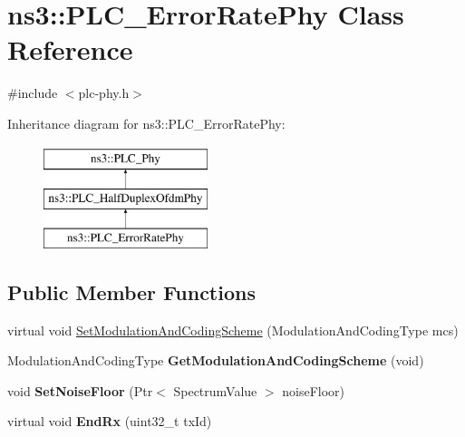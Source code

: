 \hypertarget{classns3_1_1PLC__ErrorRatePhy}{\section{ns3\-:\-:\-P\-L\-C\-\_\-\-Error\-Rate\-Phy \-Class \-Reference}
\label{classns3_1_1PLC__ErrorRatePhy}
}


{\ttfamily \#include $<$plc-\/phy.\-h$>$}

\-Inheritance diagram for ns3\-:\-:\-P\-L\-C\-\_\-\-Error\-Rate\-Phy\-:\begin{figure}[H]
\begin{center}
\leavevmode
\includegraphics[height=3.000000cm]{classns3_1_1PLC__ErrorRatePhy}
\end{center}
\end{figure}
\subsection*{\-Public \-Member \-Functions}
\begin{DoxyCompactItemize}
\item 
virtual void \hyperlink{classns3_1_1PLC__ErrorRatePhy_a108a0f187ead3c1a8aa90d03f95bd653}{\-Set\-Modulation\-And\-Coding\-Scheme} (\-Modulation\-And\-Coding\-Type mcs)
\item 
\hypertarget{classns3_1_1PLC__ErrorRatePhy_a158678f9689b9111992c3137f6a0ed57}{\-Modulation\-And\-Coding\-Type {\bfseries \-Get\-Modulation\-And\-Coding\-Scheme} (void)}\label{classns3_1_1PLC__ErrorRatePhy_a158678f9689b9111992c3137f6a0ed57}

\item 
\hypertarget{classns3_1_1PLC__ErrorRatePhy_a06394655b56153d58d96d118ee77803b}{void {\bfseries \-Set\-Noise\-Floor} (\-Ptr$<$ \-Spectrum\-Value $>$ noise\-Floor)}\label{classns3_1_1PLC__ErrorRatePhy_a06394655b56153d58d96d118ee77803b}

\item 
\hypertarget{classns3_1_1PLC__ErrorRatePhy_a1441d74fc6df47217973c0d9411333f5}{virtual void {\bfseries \-End\-Rx} (uint32\-\_\-t tx\-Id)}\label{classns3_1_1PLC__ErrorRatePhy_a1441d74fc6df47217973c0d9411333f5}

\end{DoxyCompactItemize}

